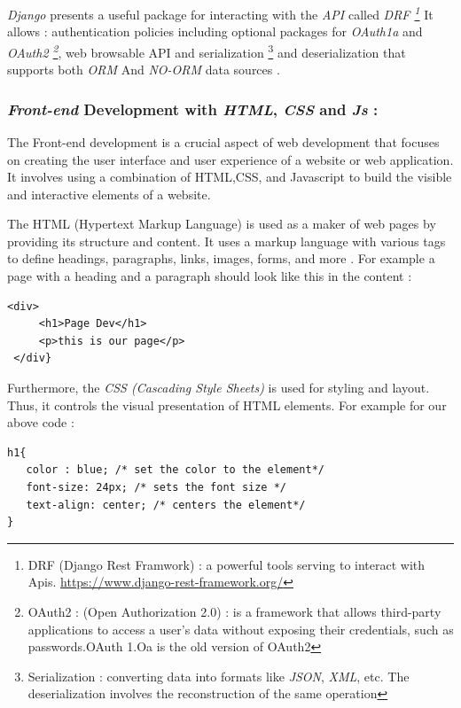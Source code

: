 \documentclass[12pt,a4paper]{report}
\begin{document}
\textit{Django} presents a useful package for interacting with the \textit{API} called \textit{DRF \footnote{DRF (Django Rest Framwork) : a powerful tools serving to interact with Apis. \url{https://www.django-rest-framework.org/}}} It allows : authentication policies including optional packages for \textit{OAuth1a} and \textit{OAuth2 \footnote{OAuth2 :   (Open Authorization 2.0) : is a framework that allows third-party applications to access a user's data without exposing their credentials, such as passwords.OAuth 1.Oa is the old version of OAuth2  }}, web browsable API  and serialization \footnote{Serialization : converting data into formats like \textit{JSON}, \textit{XML}, etc. The deserialization involves the reconstruction of the same operation} and deserialization that supports both \textit{ORM} And \textit{NO-ORM} data sources \cite{nader2023django}. 
 
\subsubsection{\large \textit{Front-end} Development with \textit{HTML}, \textit{CSS} and \textit{Js} :} 
The Front-end development is a crucial aspect of web development that focuses on creating the user interface and user experience of a website or web application. It involves using a combination of HTML,CSS, and Javascript to build the visible and interactive elements of a website. 

The HTML (Hypertext Markup Language) is used as a maker of web pages by providing its structure and content. It uses a markup language with various tags to define headings, paragraphs, links, images, forms, and more \cite{stark2010building}. For example a page with a heading and a paragraph should look like this in the content :
\begin{lstlisting}[style=stylepython]
 <div>
     <h1>Page Dev</h1>
     <p>this is our page</p>
 </div}
\end{lstlisting}

Furthermore, the \textit{CSS (Cascading Style Sheets)} is used for styling and layout. Thus, it controls the visual presentation of HTML elements. For example for our above code : \newline
\begin{lstlisting}[style=stylepython]
h1{
   color : blue; /* set the color to the element*/
   font-size: 24px; /* sets the font size */
   text-align: center; /* centers the element*/
}
\end{lstlisting} 
\end{document}
